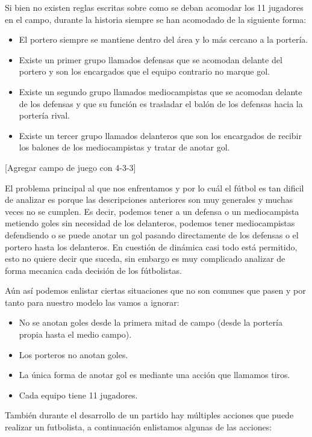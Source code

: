 \documentclass[
  us-letterpaper,
  DIV=11,
  numbers=noendperiod]{scrreprt}
\providecommand{\tightlist}{%
  \setlength{\itemsep}{0pt}\setlength{\parskip}{0pt}}\usepackage{longtable,booktabs,array}
\begin{document}
Si bien no existen reglas escritas sobre como se deban acomodar los 11
jugadores en el campo, durante la historia siempre se han acomodado de
la siguiente forma:

\begin{itemize}
\tightlist
\item
  El portero siempre se mantiene dentro del área y lo más cercano a la
  portería.
\item
  Existe un primer grupo llamados defensas que se acomodan delante del
  portero y son los encargados que el equipo contrario no marque gol.
\item
  Existe un segundo grupo llamados mediocampistas que se acomodan
  delante de los defensas y que su función es trasladar el balón de los
  defensas hacia la portería rival.
\item
  Existe un tercer grupo llamados delanteros que son los encargados de
  recibir los balones de los mediocampistas y tratar de anotar gol.
\end{itemize}

{[}Agregar campo de juego con 4-3-3{]}

El problema principal al que nos enfrentamos y por lo cuál el fútbol es
tan dificil de analizar es porque las descripciones anteriores son muy
generales y muchas veces no se cumplen. Es decir, podemos tener a un
defensa o un mediocampista metiendo goles sin necesidad de los
delanteros, podemos tener mediocampistas defendiendo o se puede anotar
un gol pasando directamente de los defensas o el portero hasta los
delanteros. En cuestión de dinámica casi todo está permitido, esto no
quiere decir que suceda, sin embargo es muy complicado analizar de forma
mecanica cada decisión de los fútbolistas.

Aún así podemos enlistar ciertas situaciones que no son comunes que
pasen y por tanto para nuestro modelo las vamos a ignorar:

\begin{itemize}
\tightlist
\item
  No se anotan goles desde la primera mitad de campo (desde la portería
  propia hasta el medio campo).
\item
  Los porteros no anotan goles.
\item
  La única forma de anotar gol es mediante una acción que llamamos
  tiros.
\item
  Cada equipo tiene 11 jugadores.
\end{itemize}

También durante el desarrollo de un partido hay múltiples acciones que
puede realizar un futbolista, a continuación enlistamos algunas de las
acciones:
\end{document}
